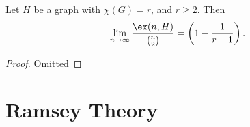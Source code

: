 \begin{theorem}
	Let $H$ be a graph with $\chi(G) = r$, and $r \geq 2$. Then
	$$
	\lim_{n \to \infty} \frac{\ex(n, H)}{\binom{n}{2}} = \left(1 - \frac{1}{r - 1}\right).
	$$
\end{theorem}
\begin{proof}[Proof]
	Omitted\let\qed\relax
\end{proof}

\section{Ramsey Theory}

